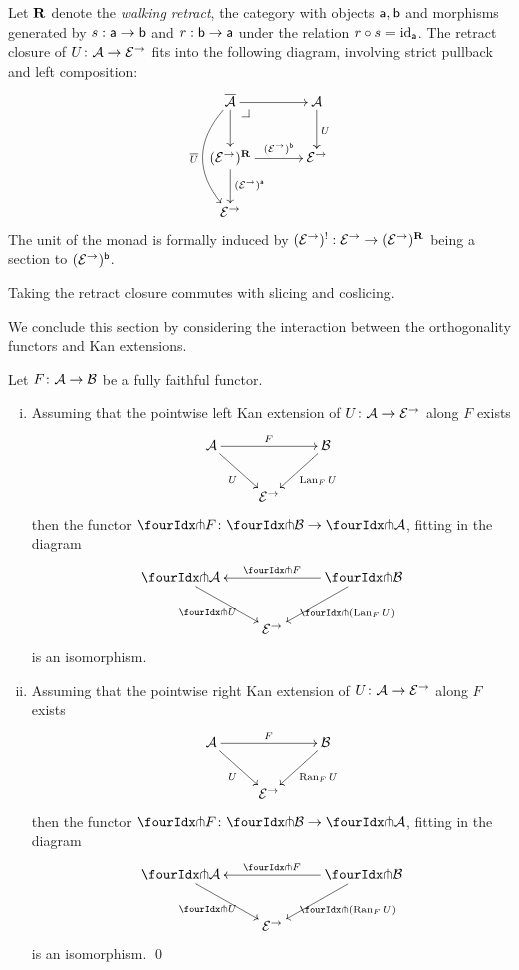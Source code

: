 \documentclass[reqno,10pt,a4paper,oneside]{amsart}
\begin{document}
\begin{remark} Let $\mathbf{R}$ denote the \emph{walking retract}, \ie the category with objects $\mathsf{a}, \mathsf{b}$ and morphisms generated by $s : \mathsf{a} \to \mathsf{b}$ and $r : \mathsf{b} \to \mathsf{a}$ under the relation $r \mathbin{\circ} s = \operatorname{id}_{\mathsf{a}}$. The retract closure of $U \colon \mathcal{A} \to \mathcal{E}^\to$ fits into the following diagram, involving strict pullback and left composition:
\[
\xymatrix@C+1em{
  \overline{\cal{A}}
  \ar[r]
  \ar[d]
  \ar@/_2em/[dd]_{\overline{U}}
  \pullback{dr}
&
  \cal{A}
  \ar[d]^{U}
\\
  (\catE^{\to})^{\ret}
  \ar[r]^-{(\catE^{\to})^{\retB}}
  \ar[d]^{(\catE^{\to})^{\retA}}
&
  \catE^{\to}
\\
  \catE^{\to}
}
\]
The unit of the monad is formally induced by $(\mathcal{E}^{\to})^{\mathord{!}} : \mathcal{E}^{\to} \to (\mathcal{E}^{\to})^{\mathbf{R}}$ being a section to $(\mathcal{E}^{\to})^{\mathsf{b}}$.
\end{remark}


\begin{remark}
\label{retract-closure-slicing}
Taking the retract closure commutes with slicing and coslicing.
\end{remark}

\medskip

We conclude this section by considering the interaction between the orthogonality functors and  Kan extensions.




\begin{lemma} Let $F \colon \mathcal{A} \to \mathcal{B}$ be a fully faithful functor. 
\label{kan-extension-closure}
\begin{enumerate}[(i)]
\item Assuming that the pointwise left Kan extension of 
$U \colon \mathcal{A} \to \mathcal{E}^{\to}$ along $F$ exists
\[
\xymatrix{
  \cal{A}
  \ar[dr]_{U}
  \ar[rr]^{F}
&&
  \cal{B}
  \ar[dl]^{\Lan_F U}
\\&
  \catE^{\to}
}
\]
then the functor $\liftr{F} \co \liftr{\cal{B}} \to \liftr{\cal{A}}$,  fitting in the diagram
\[
\xymatrix{
  \liftr{\cal{A}}
  \ar[dr]_{\liftr{U}}
&&
  \liftr{\cal{B}}
  \ar[ll]_{\liftr{F}}
  \ar[dl]^{\liftr{(\Lan_F U)}}
\\&
  \catE^{\to}
}
\]
is an isomorphism.
\item Assuming that the pointwise right Kan extension of 
$U \colon \mathcal{A} \to \mathcal{E}^{\to}$ along $F$ exists
\[
\xymatrix{
  \cal{A}
  \ar[dr]_{U}
  \ar[rr]^{F}
&&
  \cal{B}
  \ar[dl]^{\Ran_F U}
\\&
  \catE^{\to}
}
\]
then the functor $\liftl{F} \co \liftl{\cal{B}} \to \liftl{\cal{A}}$, fitting in the diagram
\[
\xymatrix{
  \liftl{\cal{A}}
  \ar[dr]_{\liftl{U}}
&&
  \liftl{\cal{B}}
  \ar[ll]_{\liftl{F}}
  \ar[dl]^{\liftl{(\Ran_F U)}}
\\&
  \catE^{\to}
}
\]
is an isomorphism. \qed
\end{enumerate}
\end{lemma}
\end{document}
